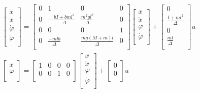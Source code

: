 \begin{equation}
\begin{aligned}
&\begin{bmatrix}
\dot x\\
\ddot x\\
\dot{\varphi}\\
\ddot{\varphi}\\
\end{bmatrix}
=
\begin{bmatrix}
0 & 1 & 0 & 0\\
0 & -\frac{bI+bml^2}{\Delta} & \frac{m^2gl^2}{\Delta} & 0\\
0 & 0 & 0 & 1\\
0 & \frac{-mlb}{\Delta} & \frac{mg(M+m)l}{\Delta} & 0\\
\end{bmatrix}
\begin{bmatrix}
x\\
\dot x\\
\varphi\\
\dot{\varphi}\\
\end{bmatrix}
+
\begin{bmatrix}
0\\
\frac{I+ml^2}{\Delta}\\
0\\
\frac{ml}{\Delta}\\
\end{bmatrix}
u\\
&\begin{bmatrix}
x\\
\varphi\\
\end{bmatrix}
=
\begin{bmatrix}
1 &0 &0 &0\\
0 &0 &1 &0\\
\end{bmatrix}
\begin{bmatrix}
x\\
\dot x\\
\varphi\\
\dot{\varphi}\\
\end{bmatrix}
+
\begin{bmatrix}
0\\
0\\
\end{bmatrix}
u\\
\end{aligned}
\end{equation}

